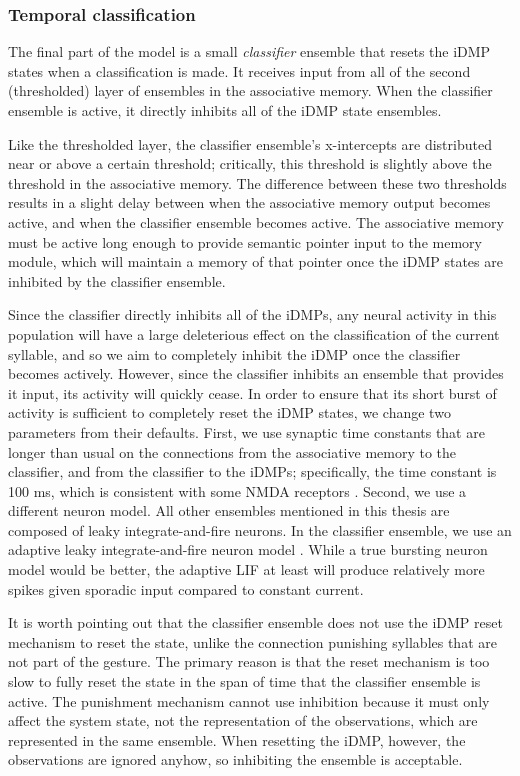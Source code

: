 \subsubsection{Temporal classification}

The final part of the model is
a small \textit{classifier} ensemble
that resets the iDMP states
when a classification is made.
It receives input from all of the
second (thresholded) layer of ensembles
in the associative memory.
When the classifier ensemble is active,
it directly inhibits
all of the iDMP state ensembles.

Like the thresholded layer,
the classifier ensemble's
x-intercepts are distributed
near or above a certain threshold;
critically, this threshold
is slightly above the threshold
in the associative memory.
The difference between these two thresholds
results in a slight delay between
when the associative memory
output becomes active,
and when the classifier ensemble becomes active.
The associative memory
must be active long enough to provide
semantic pointer input to the
memory module,
which will maintain a memory of that pointer
once the iDMP states are inhibited
by the classifier ensemble.

Since the classifier directly inhibits
all of the iDMPs, any neural activity in this population
will have a large deleterious effect
on the classification of the current syllable,
and so we aim to completely inhibit
the iDMP once the classifier becomes actively.
However, since the classifier inhibits
an ensemble that provides it input,
its activity will quickly cease.
In order to ensure that its short burst of activity
is sufficient to completely reset
the iDMP states,
we change two parameters from their defaults.
First, we use synaptic time constants
that are longer than usual on the connections
from the associative memory to the classifier,
and from the classifier to the iDMPs;
specifically, the time constant is 100 ms,
which is consistent with some NMDA receptors
\cite{sah1990}.
Second, we use a different neuron model.
All other ensembles mentioned in this thesis
are composed of leaky integrate-and-fire neurons.
In the classifier ensemble,
we use an adaptive leaky integrate-and-fire neuron model
\cite{koch1998}.
While a true bursting neuron model
would be better,
the adaptive LIF at least will produce
relatively more spikes given
sporadic input compared to constant current.

It is worth pointing out that the
classifier ensemble does not use the
iDMP reset mechanism to reset the state,
unlike the connection punishing
syllables that are not part of the gesture.
The primary reason is that the reset mechanism
is too slow to fully reset the state
in the span of time that the classifier ensemble
is active.
The punishment mechanism cannot use inhibition
because it must only affect the system state,
not the representation of the observations,
which are represented in the same ensemble.
When resetting the iDMP, however,
the observations are ignored anyhow,
so inhibiting the ensemble
is acceptable.

